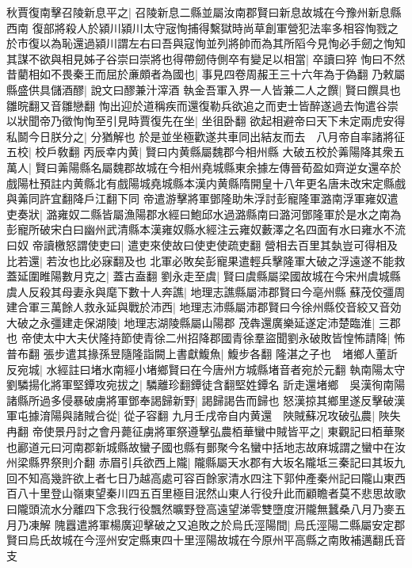 秋賈復南擊召陵新息平之|{
	召陵新息二縣並屬汝南郡賢曰新息故城在今豫州新息縣西南}
復部將殺人於潁川潁川太守宼恂捕得繫獄時尚草創軍營犯法率多相容恂戮之於市復以為恥還過潁川謂左右曰吾與寇恂並列將帥而為其所䧟今見恂必手劒之恂知其謀不欲與相見姊子谷崇曰崇將也得帶劒侍側卒有變足以相當|{
	卒讀曰猝}
恂曰不然昔藺相如不畏秦王而屈於亷頗者為國也|{
	事見四卷周赧王三十六年為于偽翻}
乃敕屬縣盛供具儲酒醪|{
	說文曰醪兼汁滓酒}
執金吾軍入界一人皆兼二人之饌|{
	賢曰饌具也雛晥翻又音雛戀翻}
恂出迎於道稱疾而還復勒兵欲追之而吏士皆醉遂過去恂遣谷崇以狀聞帝乃徵恂恂至引見時賈復先在坐|{
	坐徂卧翻}
欲起相避帝曰天下未定兩虎安得私鬬今日朕分之|{
	分猶解也}
於是並坐極歡遂共車同出結友而去　八月帝自率諸將征五校|{
	校戶敎翻}
丙辰幸内黄|{
	賢曰内黄縣屬魏郡今相州縣}
大破五校於羛陽降其衆五萬人|{
	賢曰羛陽縣名屬魏郡故城在今相州堯城縣東余據左傳晉荀盈如齊逆女還卒於戲陽杜預註内黄縣北有戲陽城堯城縣本漢内黄縣隋開皇十八年更名唐未改宋定縣戲與羛同許宜翻降戶江翻下同}
帝遣游擊將軍鄧隆助朱浮討彭寵隆軍潞南浮軍雍奴遣吏奏狀|{
	潞雍奴二縣皆屬漁陽郡水經曰鮑邱水過潞縣南曰潞河鄧隆軍於是水之南為彭寵所破宋白曰幽州武清縣本漢雍奴縣水經注云雍奴藪澤之名四面有水曰雍水不流曰奴}
帝讀檄怒謂使吏曰|{
	遣吏來使故曰使吏使疏吏翻}
營相去百里其埶豈可得相及比若還|{
	若汝也比必寐翻及也}
北軍必敗矣彭寵果遣輕兵擊隆軍大破之浮遠遂不能救　蓋延圍睢陽數月克之|{
	蓋古盍翻}
劉永走至虞|{
	賢曰虞縣屬梁國故城在今宋州虞城縣}
虞人反殺其母妻永與麾下數十人奔譙|{
	地理志譙縣屬沛郡賢曰今亳州縣}
蘇茂佼彊周建合軍三萬餘人救永延與戰於沛西|{
	地理志沛縣屬沛郡賢曰今徐州縣佼音絞又音効}
大破之永彊建走保湖陵|{
	地理志湖陵縣屬山陽郡}
茂犇還廣樂延遂定沛楚臨淮|{
	三郡也}
帝使太中大夫伏隆持節使青徐二州招降郡國青徐羣盜聞劉永破敗皆惶怖請降|{
	怖普布翻}
張步遣其掾孫昱隨隆詣闕上書獻鰒魚|{
	鰒步各翻}
隆湛之子也　堵鄉人董訢反宛城|{
	水經註曰堵水南經小堵鄉賢曰在今唐州方城縣堵音者宛於元翻}
執南陽太守劉驎揚化將軍堅鐔攻宛拔之|{
	驎離珍翻鐔徒含翻堅姓鐔名}
訢走還堵鄉　吳漢徇南陽諸縣所過多侵暴破虜將軍鄧奉謁歸新野|{
	謁歸謁告而歸也}
怒漢掠其鄉里遂反擊破漢軍屯據淯陽與諸賊合從|{
	從子容翻}
九月壬戌帝自内黄還　陜賊蘇况攻破弘農|{
	陜失冉翻}
帝使景丹討之會丹薨征虜將軍祭遵擊弘農栢華蠻中賊皆平之|{
	東觀記曰栢華聚也酈道元曰河南郡新城縣故蠻子國也縣有鄤聚今名蠻中括地志故麻城謂之蠻中在汝州梁縣界祭則介翻}
赤眉引兵欲西上隴|{
	隴縣屬天水郡有大坂名隴坻三秦記曰其坂九回不知高幾許欲上者七日乃越高處可容百餘家清水四注下郭仲產秦州記曰隴山東西百八十里登山嶺東望秦川四五百里極目泯然山東人行役升此而顧瞻者莫不悲思故歌曰隴頭流水分離四下念我行役飄然曠野登高遠望涕零雙墮度汧隴無蠶桑八月乃麥五月乃凍解}
隗囂遣將軍楊廣迎擊破之又追敗之於烏氏涇陽間|{
	烏氏涇陽二縣屬安定郡賢曰烏氏故城在今涇州安定縣東四十里涇陽故城在今原州平高縣之南敗補邁翻氏音支}
